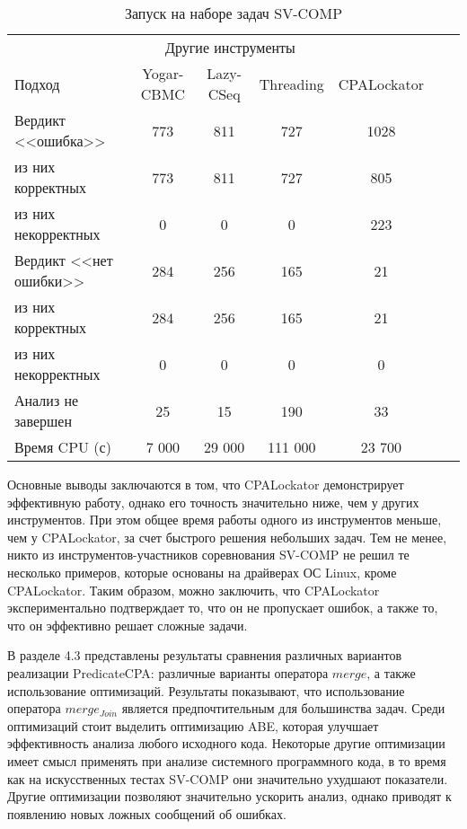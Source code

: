 \begin{center}
  \begin{table}[h]\footnotesize \centering
  	\label{table-sv-comp-tools}
    \caption{Запуск на наборе задач SV-COMP}
    \begin{tabular}{ | l | c | c | c | c | c | c |}
      \hline
      		 & \multicolumn{3}{c|}{Другие инструменты} & 		 \\
      Подход         				& Yogar-CBMC 	& Lazy-CSeq  & Threading & CPALockator   \\ \hline
      Вердикт <<ошибка>> 			& 773       	& 811       & 727      & 1028    			\\ 
  \hspace{0.5cm} из них корректных 	& 773       	& 811       & 727      & 805 				\\ 
  \hspace{0.5cm} из них некорректных& 0    		& 0       		& 0      & 223 		     \\ \hline
      Вердикт <<нет ошибки>>  		& 284        	& 256     & 165     & 21      		  \\ 
  \hspace{0.5cm} из них корректных 	& 284        	& 256     & 165   	& 21      		      \\
  \hspace{0.5cm} из них некорректных & 0 			& 0       	& 0         	& 0        \\ \hline
      Анализ не завершен       		& 25        	& 15      & 190     & 33     		 	\\ \hline
      Время CPU (с)   				& 7 000    		& 29 000   & 111 000  & 23 700 			 \\ 
      \hline
    \end{tabular}
  \end{table}
\end{center}

Основные выводы заключаются в том, что CPALockator демонстрирует эффективную работу, однако его точность значительно ниже, чем у других инструментов.
При этом общее время работы одного из инструментов меньше, чем у CPALockator, за счет быстрого решения небольших задач.
Тем не менее, никто из инструментов-участников соревнования SV-COMP не решил те несколько примеров, которые основаны на драйверах ОС Linux, кроме CPALockator.
Таким образом, можно заключить, что CPALockator экспериментально подтверждает то, что он не пропускает ошибок, а также то, что он эффективно решает сложные задачи.

В разделе 4.3 представлены результаты сравнения различных вариантов реализации PredicateCPA: различные варианты оператора $merge$, а также использование оптимизаций.
Результаты показывают, что использование оператора $merge_{Join}$ является предпочтительным для большинства задач.
Среди оптимизаций стоит выделить оптимизацию ABE, которая улучшает эффективность анализа любого исходного кода.
Некоторые другие оптимизации имеет смысл применять при анализе системного программного кода, в то время как на искусственных тестах SV-COMP они значительно ухудшают показатели.
Другие оптимизации позволяют значительно ускорить анализ, однако приводят к появлению новых ложных сообщений об ошибках.

